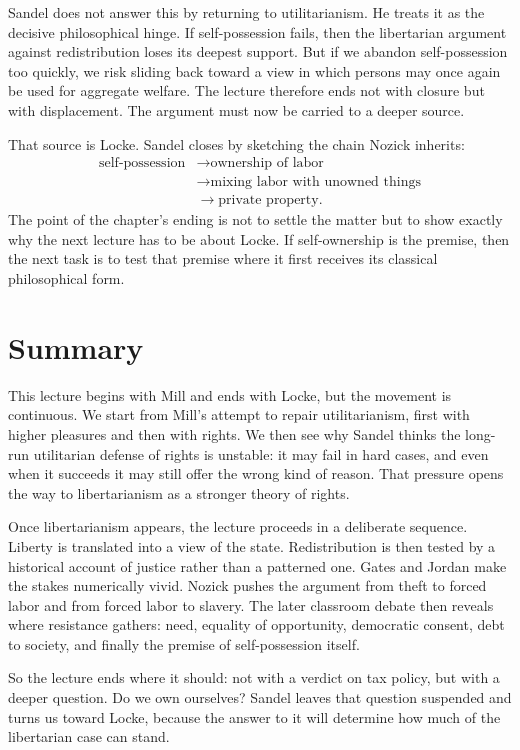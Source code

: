 Sandel does not answer this by returning to utilitarianism. He treats it as the decisive philosophical hinge. If self-possession fails, then the libertarian argument against redistribution loses its deepest support. But if we abandon self-possession too quickly, we risk sliding back toward a view in which persons may once again be used for aggregate welfare. The lecture therefore ends not with closure but with displacement. The argument must now be carried to a deeper source.

That source is Locke. Sandel closes by sketching the chain Nozick inherits:
\begin{equation}
\begin{aligned}
\text{self-possession}
&\to \text{ownership of labor} \\
&\to \text{mixing labor with unowned things} \\
&\to \text{private property}.
\end{aligned}
\end{equation}
The point of the chapter's ending is not to settle the matter but to show exactly why the next lecture has to be about Locke. If self-ownership is the premise, then the next task is to test that premise where it first receives its classical philosophical form.

\section{Summary}

This lecture begins with Mill and ends with Locke, but the movement is continuous. We start from Mill's attempt to repair utilitarianism, first with higher pleasures and then with rights. We then see why Sandel thinks the long-run utilitarian defense of rights is unstable: it may fail in hard cases, and even when it succeeds it may still offer the wrong kind of reason. That pressure opens the way to libertarianism as a stronger theory of rights.

Once libertarianism appears, the lecture proceeds in a deliberate sequence. Liberty is translated into a view of the state. Redistribution is then tested by a historical account of justice rather than a patterned one. Gates and Jordan make the stakes numerically vivid. Nozick pushes the argument from theft to forced labor and from forced labor to slavery. The later classroom debate then reveals where resistance gathers: need, equality of opportunity, democratic consent, debt to society, and finally the premise of self-possession itself.

So the lecture ends where it should: not with a verdict on tax policy, but with a deeper question. Do we own ourselves? Sandel leaves that question suspended and turns us toward Locke, because the answer to it will determine how much of the libertarian case can stand.
